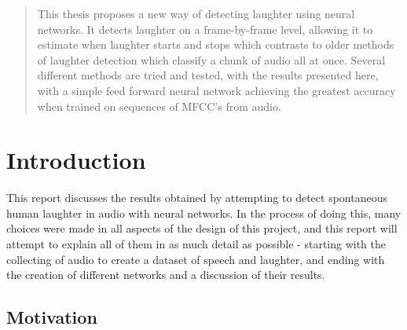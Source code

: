 \documentclass[a4paper,11pt,notitlepage]{article}
\begin{document}
\null\vspace{\fill}
\begin{abstract}
	This thesis proposes a new way of detecting laughter using neural networks. It detects laughter on a frame-by-frame level, allowing it to estimate when laughter starts and stops which contrasts to older methods of laughter detection which classify a chunk of audio all at once. Several different methods are tried and tested, with the results presented here, with a simple feed forward neural network achieving the greatest accuracy when trained on sequences of MFCC's from audio.
\end{abstract}
\vspace{\fill}

\clearpage

\renewcommand*\contentsname{Table of Contents}

\tableofcontents

\clearpage

\section{Introduction}


This report discusses the results obtained by attempting to detect spontaneous human laughter in audio with neural networks. In the process of doing this, many choices were made in all aspects of the design of this project, and this report will attempt to explain all of them in as much detail as possible - starting with the collecting of audio to create a dataset of speech and laughter, and ending with the creation of different networks and a discussion of their results.

\subsection{Motivation}

\end{document}
